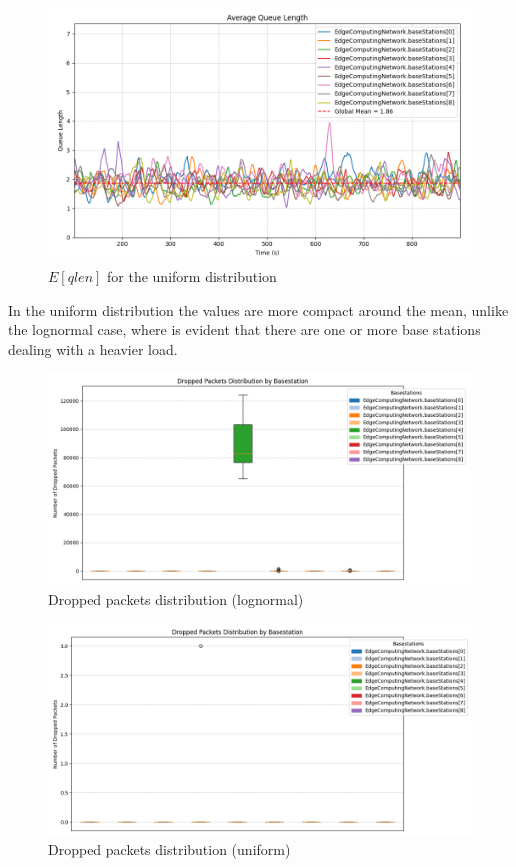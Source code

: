 \documentclass{report}
\begin{document}
\begin{figure}[H]
    \centering
    \includegraphics[width=\textwidth]{img/plots/uni_1e3_A/qlen.png}
    \caption{$E[qlen]$ for the uniform distribution}
\end{figure}

In the uniform distribution the values are more compact around the mean, unlike the lognormal case, where is evident that there are one or more base stations dealing with a heavier load.

\begin{figure}[H]
    \centering
    \includegraphics[width=\textwidth]{img/plots/log_1e3_A/dropped.png}
    \caption{Dropped packets distribution (lognormal)}
\end{figure}

\begin{figure}[H]
    \centering
    \includegraphics[width=\textwidth]{img/plots/uni_1e3_A/dropped.png}
    \caption{Dropped packets distribution (uniform)}
\end{figure}
\end{document}
